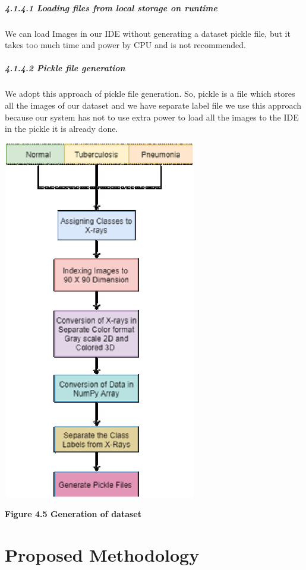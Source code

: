 \documentclass{article} %
\begin{document}
\noindent 
\subparagraph{4.1.4.1 Loading files from local storage on runtime }

\noindent We can load Images in our IDE without generating a dataset pickle file, but it takes too much time and power by CPU and is not recommended.

\noindent 
\subparagraph{4.1.4.2 Pickle file generation  }

\noindent We adopt this approach of pickle file generation. So, pickle is a file which stores all the images of our dataset and we have separate label file we use this approach because our system has not to use extra power to load all the images to the IDE in the pickle it is already done.

\noindent \includegraphics*[width=3.33in, height=6.22in, keepaspectratio=false]{image19}

\noindent \textbf{Figure 4.5 Generation of dataset}

\noindent \eject 

\noindent 


\section{ Proposed Methodology}
\end{document}
